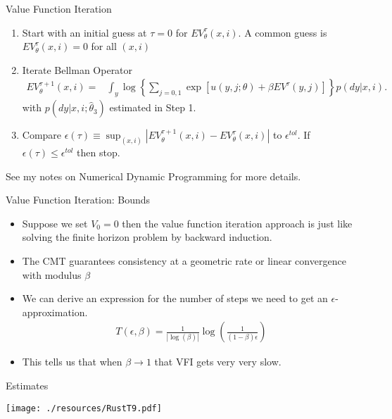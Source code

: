 \documentclass[xcolor=pdftex,dvipsnames,table,mathserif,aspectratio=169]{beamer}
\begin{document}
\begin{frame}{Value Function Iteration}
\footnotesize
\begin{enumerate}
\item Start with an initial guess at $\tau=0$ for $EV^{\tau}_{\theta}(x,i)$. A common guess is $EV_{\theta}^{\tau}(x,i) = 0$ for all $(x,i)$
\item Iterate Bellman Operator
\begin{eqnarray*}
EV_{\theta}^{\tau+1}(x,i)= & \int_y \log  \left \{ \sum_{j=0,1} \exp [ u(y, j ; \theta)  + \beta EV^{\tau}(y,j)] \right \} p(dy|x,i).
\end{eqnarray*}
with $p(dy | x, i; \hat \theta_3)$ estimated in Step 1.
\item Compare $\epsilon(\tau) \equiv \sup_{(x,i)} | EV_{\theta}^{\tau+1}(x,i) - EV_{\theta}^{\tau}(x,i)|$ to $\epsilon^{tol}$. If $\epsilon(\tau) \leq \epsilon^{tol}$ then stop.
\end{enumerate}
See my notes on Numerical Dynamic Programming for more details.
\end{frame}



\begin{frame}{Value Function Iteration: Bounds}
\begin{itemize}
\item Suppose we set $V_0 =0$ then the value function iteration approach is just like solving the finite horizon problem by backward induction.
\item The CMT guarantees consistency at a geometric rate or \alert{linear} convergence with modulus $\beta$
\item We can derive an expression for the number of steps we need to get an $\epsilon$-approximation.
\begin{eqnarray*}
T(\epsilon,\beta) = \frac{1}{| \log(\beta) | } \log \left (\frac{1}{(1-\beta)\epsilon} \right)
\end{eqnarray*}
\item This tells us that when $\beta \rightarrow 1$ that VFI gets very very slow.
\end{itemize}
\end{frame}



\begin{frame}{Estimates}
\begin{center}
\hspace*{-.5cm}\texttt{[image: ./resources/RustT9.pdf]}
\end{center}
\end{frame}
\end{document}
